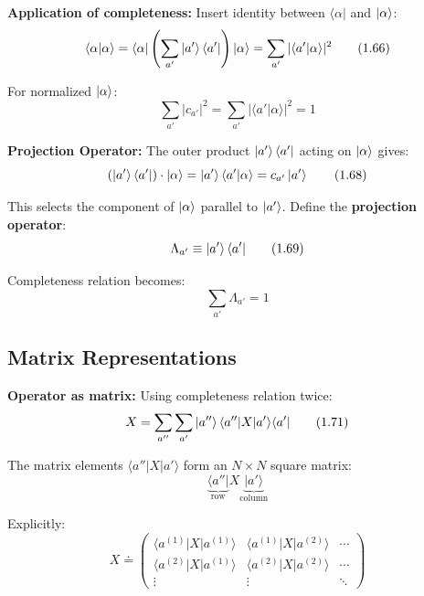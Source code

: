 \documentclass[11pt,a4paper]{article}
\begin{document}
\textbf{Application of completeness:}
Insert identity between $\langle\alpha|$ and $\ket{\alpha}$:
\begin{equation}
\langle\alpha|\alpha\rangle = \langle\alpha|\left(\sum_{a'}\ket{a'}\langle a'|\right)|\alpha\rangle = \sum_{a'}|\langle a'|\alpha\rangle|^2
\tag{1.66}
\end{equation}

For normalized $\ket{\alpha}$:
\begin{equation}
\sum_{a'}|c_{a'}|^2 = \sum_{a'}|\langle a'|\alpha\rangle|^2 = 1
\tag{1.67}
\end{equation}

\textbf{Projection Operator:}
The outer product $\ket{a'}\langle a'|$ acting on $\ket{\alpha}$ gives:
\begin{equation}
(\ket{a'}\langle a'|) \cdot \ket{\alpha} = \ket{a'}\langle a'|\alpha\rangle = c_{a'}\ket{a'}
\tag{1.68}
\end{equation}

This selects the component of $\ket{\alpha}$ parallel to $\ket{a'}$. Define the \textbf{projection operator}:
\begin{equation}
\Lambda_{a'} \equiv \ket{a'}\langle a'|
\tag{1.69}
\end{equation}

Completeness relation becomes:
\begin{equation}
\sum_{a'}\Lambda_{a'} = 1
\tag{1.70}
\end{equation}

\subsection{Matrix Representations}

\textbf{Operator as matrix:}
Using completeness relation twice:
\begin{equation}
X = \sum_{a''}\sum_{a'}\ket{a''}\langle a''|X|a'\rangle\langle a'|
\tag{1.71}
\end{equation}

The matrix elements $\langle a''|X|a'\rangle$ form an $N \times N$ square matrix:
\begin{equation}
\underbrace{\langle a''|}_{\text{row}} X \underbrace{|a'\rangle}_{\text{column}}
\tag{1.72}
\end{equation}

Explicitly:
\begin{equation}
X \doteq \begin{pmatrix}
\langle a^{(1)}|X|a^{(1)}\rangle & \langle a^{(1)}|X|a^{(2)}\rangle & \cdots \\
\langle a^{(2)}|X|a^{(1)}\rangle & \langle a^{(2)}|X|a^{(2)}\rangle & \cdots \\
\vdots & \vdots & \ddots
\end{pmatrix}
\tag{1.73}
\end{equation}
\end{document}
